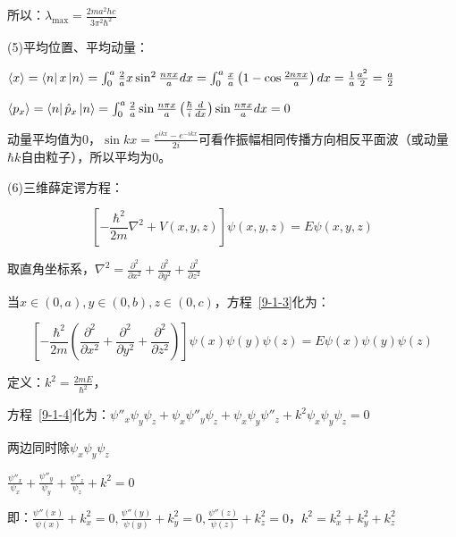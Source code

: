 所以：$\lambda _{\max }  = \frac{{2ma^2 hc}}{{3\pi ^2 \hbar ^2 }}$


(5)平均位置、平均动量：

$\left\langle x \right\rangle  = \left\langle n \right|x\left| n \right\rangle  = \int_0^a {{\textstyle{2 \over a}}} x\sin ^2 {\textstyle{{n\pi x} \over a}}dx = \int_0^a {\frac{x}{a}} \left( {1 - \cos {\textstyle{{2n\pi x} \over a}}} \right)dx = \frac{1}{a}\frac{{a^2 }}{2} = \frac{a}{2}$


$\left\langle {p_x } \right\rangle  = \left\langle n \right|\hat p_x \left| n \right\rangle  = \int_0^a {{\textstyle{2 \over a}}} \sin {\textstyle{{n\pi x} \over a}}\left( {\frac{\hbar }{i}\frac{d}{{dx}}} \right)\sin {\textstyle{{n\pi x} \over a}}dx = 0$


动量平均值为0，$\sin kx = \frac{{e^{ikx}  - e^{ - ikx} }}{{2i}}$可看作振幅相同传播方向相反平面波（或动量$\hbar k$自由粒子），所以平均为0。


(6)三维薛定谔方程：

\begin{equation}\label{9-1-3}
\left[ { - \frac{{\hbar ^2 }}{{2m}}\nabla ^2  + V(x,y,z)} \right]\psi (x,y,z) = E\psi (x,y,z)
\end{equation}


取直角坐标系，$\nabla ^2  = \frac{{\partial ^2 }}{{\partial x^2 }} + \frac{{\partial ^2 }}{{\partial y^2 }} + \frac{{\partial ^2 }}{{\partial z^2 }}$


当$x \in \left( {0,a} \right),y \in (0,b),z \in (0,c)$，方程~\ref{9-1-3}化为：


\begin{equation}\label{9-1-4}
\left[ { - \frac{{\hbar ^2 }}{{2m}}\left( {\frac{{\partial ^2 }}{{\partial x^2 }} + \frac{{\partial ^2 }}{{\partial y^2 }} + \frac{{\partial ^2 }}{{\partial z^2 }}} \right)} \right]\psi (x)\psi (y)\psi (z) = E\psi (x)\psi (y)\psi (z)
\end{equation}


定义：$k^2  = \frac{{2mE}}{{\hbar ^2 }}$，


方程~\ref{9-1-4}化为：$\psi ''_x \psi _y \psi _z  + \psi _x \psi ''_y \psi _z  + \psi _x \psi _y \psi ''_z  + k^2 \psi _x \psi _y \psi _z  = 0$


两边同时除$\psi _x \psi _y \psi _z $

$\frac{{\psi ''_x }}{{\psi _x }} + \frac{{\psi ''_y }}{{\psi _y }} + \frac{{\psi ''_z }}{{\psi _z }} + k^2  = 0$


即：$\frac{{\psi ''(x)}}{{\psi (x)}} + k_x ^2  = 0,\frac{{\psi ''(y)}}{{\psi (y)}} + k_y ^2  = 0,\frac{{\psi ''(z)}}{{\psi (z)}} + k_z ^2  = 0$，$k^2  = k_x ^2  + k_y ^2  + k_z ^2 $


